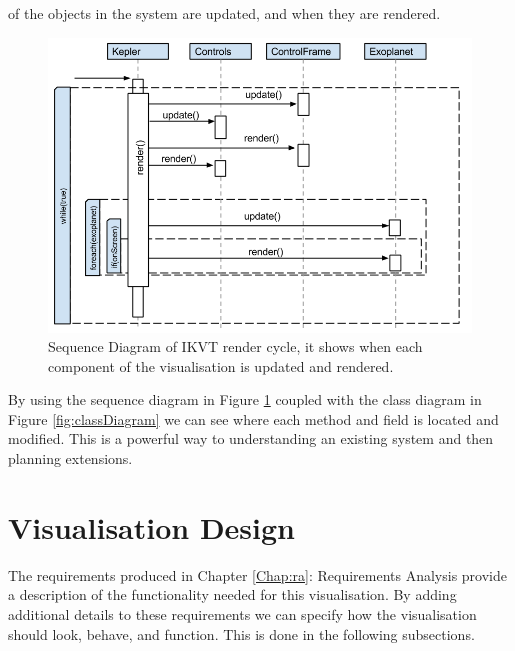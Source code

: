 \begin{enumerate}
of the objects in the system are updated, and when they are rendered. 
   \begin{figure}[H]
  \centering
      \includegraphics[width=1\textwidth]{images/sequence.png}
  \caption[Sequence Diagram of IKVT render cycle]{Sequence Diagram of IKVT
render cycle, it shows when each component of the visualisation is updated and
rendered.}  
    \label{fig:sequenceDiagram}
\end{figure}
\end{enumerate}

By using
the sequence diagram in Figure \ref{fig:sequenceDiagram} coupled with the class
diagram in Figure \ref{fig:classDiagram} we can see where each method and field
is located and modified. This is a powerful way to understanding an
existing system and then planning extensions.
\clearpage
\section{Visualisation Design}
The requirements produced in Chapter \ref{Chap:ra}: Requirements Analysis
provide a
description of the functionality needed for this
visualisation. By adding additional details to these requirements we can specify
how the visualisation should look, behave, and function. This is done in the
following subsections.

